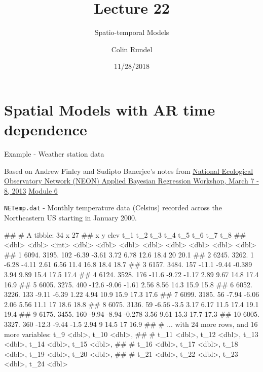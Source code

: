 \documentclass[11pt,ignorenonframetext,]{beamer}
\title{Lecture 22}
\subtitle{Spatio-temporal Models}
\author{Colin Rundel}
\date{11/28/2018}
\let\oldShaded\Shaded
\let\endoldShaded\endShaded
\let\oldverbatim\verbatim
\let\endoldverbatim\endverbatim
\renewenvironment{verbatim}{\footnotesize\begin{spacing}{0.9}\oldverbatim}{\endoldverbatim\end{spacing}}
\newcommand{\scriptoutput}{
  \renewenvironment{Shaded}{\scriptsize\begin{spacing}{0.9}\oldShaded}{\endoldShaded\end{spacing}}
  \renewenvironment{verbatim}{\scriptsize\begin{spacing}{0.9}\oldverbatim}{\endoldverbatim\end{spacing}}
}
\begin{document}
\frame{\titlepage}

\hypertarget{spatial-models-with-ar-time-dependence}{%
\section{Spatial Models with AR time
dependence}\label{spatial-models-with-ar-time-dependence}}

\begin{frame}[fragile]{Example - Weather station data}
\protect\hypertarget{example---weather-station-data}{}

\footnotesize

Based on Andrew Finley and Sudipto Banerjee's notes from
\href{http://blue.for.msu.edu/NEON/SC/}{National Ecological Observatory
Network (NEON) Applied Bayesian Regression Workshop, March 7 - 8, 2013}
\href{http://blue.for.msu.edu/NEON/SC/exercises/exercise-6/initial-exploration-spDynLM.pdf}{Module
6}

\texttt{NETemp.dat} - Monthly temperature data (Celsius) recorded across
the Northeastern US starting in January 2000.

\scriptoutput

\begin{verbatim}
## # A tibble: 34 x 27
##        x     y  elev    t_1   t_2    t_3   t_4   t_5   t_6   t_7   t_8
##    <dbl> <dbl> <int>  <dbl> <dbl>  <dbl> <dbl> <dbl> <dbl> <dbl> <dbl>
##  1 6094. 3195.   102  -6.39 -3.61  3.72   6.78 12.6   18.4  20    20.1
##  2 6245. 3262.     1  -6.28 -4.11  2.61   6.56 11.4   16.8  18.4  18.7
##  3 6157. 3484.   157 -11.1  -9.44 -0.389  3.94  9.89  15.4  17.5  17.4
##  4 6124. 3528.   176 -11.6  -9.72 -1.17   2.89  9.67  14.8  17.4  16.9
##  5 6005. 3275.   400 -12.6  -9.06 -1.61   2.56  8.56  14.3  15.9  15.8
##  6 6052. 3226.   133  -9.11 -6.39  1.22   4.94 10.9   15.9  17.3  17.6
##  7 6099. 3185.    56  -7.94 -6.06  2.06   5.56 11.1   17    18.6  18.8
##  8 6075. 3136.    59  -6.56 -3.5   3.17   6.17 11.5   17.4  19.1  19.4
##  9 6175. 3455.   160  -9.94 -8.94 -0.278  3.56  9.61  15.3  17.7  17.3
## 10 6005. 3327.   360 -12.3  -9.44 -1.5    2.94  9     14.5  17    16.9
## # ... with 24 more rows, and 16 more variables: t_9 <dbl>, t_10 <dbl>,
## #   t_11 <dbl>, t_12 <dbl>, t_13 <dbl>, t_14 <dbl>, t_15 <dbl>,
## #   t_16 <dbl>, t_17 <dbl>, t_18 <dbl>, t_19 <dbl>, t_20 <dbl>,
## #   t_21 <dbl>, t_22 <dbl>, t_23 <dbl>, t_24 <dbl>
\end{verbatim}

\end{frame}
\end{document}
